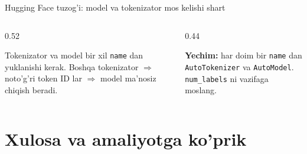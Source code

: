 \documentclass[aspectratio=169,11pt]{beamer}
\begin{document}
\begin{frame}{Hugging Face tuzog'i: model va tokenizator mos kelishi shart}
  \begin{columns}[T]
    \begin{column}{0.52\textwidth}
      \begin{tcolorbox}[warnbox,title={Nomuvofiq tokenizator}]
        \small
        Tokenizator va model bir xil \texttt{name} dan yuklanishi kerak. Boshqa
        tokenizator $\Rightarrow$ noto'g'ri token ID lar $\Rightarrow$ model
        ma'nosiz chiqish beradi.
      \end{tcolorbox}
    \end{column}
    \begin{column}{0.44\textwidth}
      \begin{tcolorbox}[okbox,top=2pt,bottom=2pt]
        \footnotesize
        \textbf{Yechim:} har doim bir \texttt{name} dan \texttt{AutoTokenizer}
        va \texttt{AutoModel}. \texttt{num\_labels} ni vazifaga moslang.
      \end{tcolorbox}
    \end{column}
  \end{columns}
\end{frame}

\section[Xulosa]{Xulosa va amaliyotga ko'prik}
\end{document}
